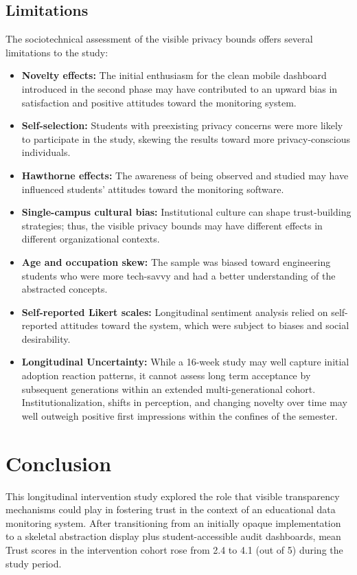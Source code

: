 \documentclass[conference]{IEEEtran}
\begin{document}
\subsection{Limitations}
The sociotechnical assessment of the visible privacy bounds offers several limitations to the study:
\begin{itemize}
    \item \textbf{Novelty effects:} The initial enthusiasm for the clean mobile dashboard introduced in the second phase may have contributed to an upward bias in satisfaction and positive attitudes toward the monitoring system.
    \item \textbf{Self-selection:} Students with preexisting privacy concerns were more likely to participate in the study, skewing the results toward more privacy-conscious individuals.
    \item \textbf{Hawthorne effects:} The awareness of being observed and studied may have influenced students’ attitudes toward the monitoring software.
    \item \textbf{Single-campus cultural bias:} Institutional culture can shape trust-building strategies; thus, the visible privacy bounds may have different effects in different organizational contexts.
    \item \textbf{Age and occupation skew:} The sample was biased toward engineering students who were more tech-savvy and had a better understanding of the abstracted concepts.
    \item \textbf{Self-reported Likert scales:} Longitudinal sentiment analysis relied on self-reported attitudes toward the system, which were subject to biases and social desirability.
    \item \textbf{Longitudinal Uncertainty:} While a 16-week study may well capture initial adoption reaction patterns, it cannot assess long term acceptance by subsequent generations within an extended multi-generational cohort. Institutionalization, shifts in perception, and changing novelty over time may well outweigh positive first impressions within the confines of the semester.
\end{itemize}

\section{Conclusion}

This longitudinal intervention study explored the role that visible transparency mechanisms could play in fostering trust in the context of an educational data monitoring system. After transitioning from an initially opaque implementation to a skeletal abstraction display plus student-accessible audit dashboards, mean Trust scores in the intervention cohort rose from 2.4 to 4.1 (out of 5) during the study period.
\end{document}
